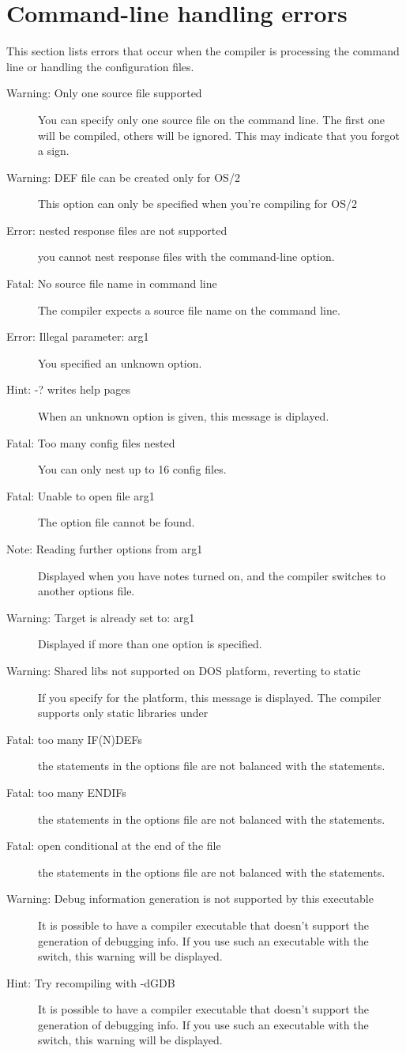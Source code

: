  \section{Command-line handling errors}
 This section lists errors that occur when the compiler is processing the
 command line or handling the configuration files.
 \begin{description}
\item [Warning: Only one source file supported]
 You can specify only one source file on the command line. The first
 one will be compiled, others will be ignored. This may indicate that
 you forgot a  sign.
\item [Warning: DEF file can be created only for OS/2]
 This option can only be specified when you're compiling for OS/2
\item [Error: nested response files are not supported]
 you cannot nest response files with the  command-line option.
\item [Fatal: No source file name in command line]
 The compiler expects a source file name on the command line.
\item [Error: Illegal parameter: arg1]
 You specified an unknown option.
\item [Hint: -? writes help pages]
 When an unknown option is given, this message is diplayed.
\item [Fatal: Too many config files nested]
 You can only nest up to 16 config files.
\item [Fatal: Unable to open file arg1]
 The option file cannot be found.
\item [Note: Reading further options from arg1]
 Displayed when you have notes turned on, and the compiler switches
 to another options file.
\item [Warning: Target is already set to: arg1]
 Displayed if more than one  option is specified.
\item [Warning: Shared libs not supported on DOS platform, reverting to static]
 If you specify  for the \dos platform, this message is displayed.
 The compiler supports only static libraries under \dos
\item [Fatal: too many IF(N)DEFs]
 the  statements in the options file are not balanced with
 the  statements.
\item [Fatal: too many ENDIFs]
 the  statements in the options file are not balanced with
 the  statements.
\item [Fatal: open conditional at the end of the file]
 the  statements in the options file are not balanced with
 the  statements.
\item [Warning: Debug information generation is not supported by this executable]
 It is possible to have a compiler executable that doesn't support 
 the generation of debugging info. If you use such an executable with the
  switch, this warning will be displayed.
\item [Hint: Try recompiling with -dGDB]
 It is possible to have a compiler executable that doesn't support 
 the generation of debugging info. If you use such an executable with the
  switch, this warning will be displayed.
 \end{description}
